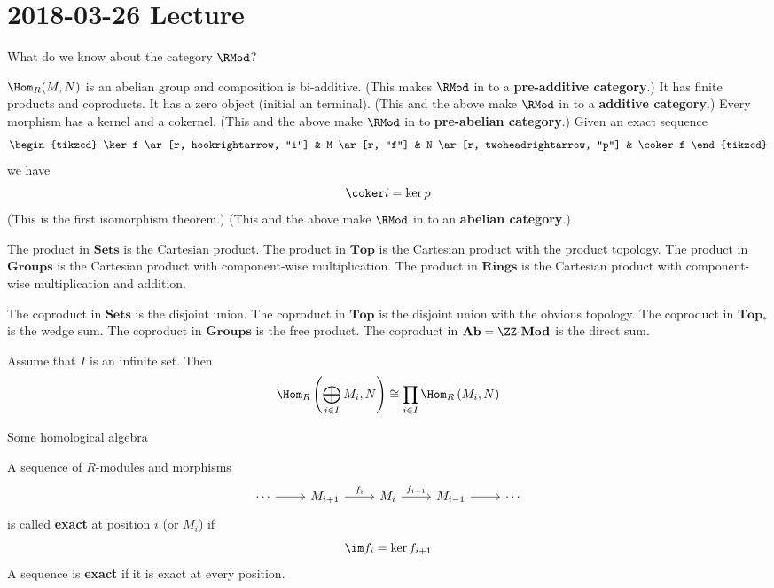 \section{2018-03-26 Lecture}

\begin{rmk}
	What do we know about the category $\RMod$?
	\begin{itm}
		\io $\Hom_R(M,N)$ is an abelian group and composition is bi-additive. (This makes $\RMod$ in to a \textbf{pre-additive category}.)
		\io It has finite products and coproducts.
		\io It has a zero object (initial an terminal). (This and the above make $\RMod$ in to a \textbf{additive category}.)
		\io Every morphism has a kernel and a cokernel. (This and the above make $\RMod$ in to  \textbf{pre-abelian category}.)
		\io Given an exact sequence
		\[
		\begin{tikzcd}
			\ker f \ar[r, hookrightarrow, "i"] & M \ar[r, "f"] & N \ar[r, twoheadrightarrow, "p"] & \coker f
		\end{tikzcd}
		\]
		we have
		\[\coker i = \ker p\]
		(This is the first isomorphism theorem.)
		(This and the above make $\RMod$ in to an \textbf{abelian category}.)
	\end{itm}
\end{rmk}

\begin{exam}
	\begin{enum}
		\io The product in $\mathbf{Sets}$ is the Cartesian product.
		The product in $\mathbf{Top}$ is the Cartesian product with the product topology.
		The product in $\mathbf{Groups}$ is the Cartesian product with component-wise multiplication.
		The product in $\mathbf{Rings}$ is the Cartesian product with component-wise multiplication and addition.
		
		\io The coproduct in $\mathbf{Sets}$ is the disjoint union.
		The coproduct in $\mathbf{Top}$ is the disjoint union with the obvious topology.
		The coproduct in $\mathbf{Top_*}$ is the wedge sum.
		The coproduct in $\mathbf{Groups}$ is the free product.
		The coproduct in $\mathbf{Ab}=\ZZ\mbox{-}\mathbf{Mod}$ is the direct sum.
		
		\io Assume that $I$ is an infinite set.
		Then
		\[\Hom_R \left(\bigoplus_{i \in I} M_i, N\right) \cong \prod_{i \in I} \Hom_R \left(M_i, N\right)\]
	\end{enum}
\end{exam}

Some homological algebra

\begin{defn}[1.9]
	A sequence of $R$-modules and morphisms
	\[
	\begin{tikzcd}
		\cdots \ar[r] & M_{i+1} \ar[r, "f_i"] & M_i \ar[r, "f_{i-1}"] & M_{i-1} \ar[r] & \cdots
	\end{tikzcd}
	\]
	is called \textbf{exact} at position $i$ (or $M_i$) if
	\[\im f_i = \ker f_{i+1}\]
	A sequence is \textbf{exact} if it is exact at every position.
\end{defn}

